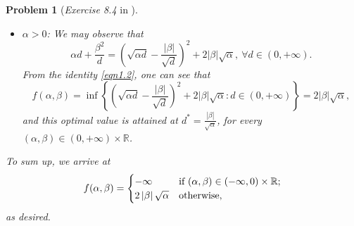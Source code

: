 \documentclass[11pt]{article}
\newtheorem{problem}{Problem}
\numberwithin{equation}{problem}
\begin{document}
\begin{problem} [\emph{Exercise 8.4} in \cite{calafiore2014optimization}]
{\begin{itemize}
    \item $\alpha > 0$: We may observe that
    \begin{equation}
        \label{eqn1.2}
        \alpha d + \frac{\beta^2}{d} = \left( \sqrt{\alpha d} - \frac{\left| \beta \right|}{\sqrt{d}} \right)^2 + 2 \left| \beta \right| \sqrt{\alpha},\ \forall d \in \left( 0, +\infty \right).
    \end{equation}
    From the identity \eqref{eqn1.2}, one can see that
    \begin{equation*}
        f(\alpha, \beta) = \inf \left\{ \left( \sqrt{\alpha d} - \frac{\left| \beta \right|}{\sqrt{d}} \right)^2 + 2 \left| \beta \right| \sqrt{\alpha} : d \in \left( 0, +\infty \right) \right\}
        = 2 \left| \beta \right| \sqrt{\alpha},
    \end{equation*}
    and this optimal value is attained at $d^* = \frac{\left| \beta \right|}{\sqrt{\alpha}}$, for every $(\alpha, \beta) \in \left( 0, +\infty \right) \times \mathbb{R}$.
\end{itemize}

\noindent To sum up, we arrive at
\begin{equation*}
    f(\alpha, \beta) =
    \begin{cases}
        - \infty & \textnormal{if } (\alpha, \beta) \in \left( -\infty, 0 \right) \times \mathbb{R}; \\
        2 \left| \beta \right| \sqrt{\alpha} & \textnormal{otherwise,}
    \end{cases}
\end{equation*}
as desired. 
\medskip

}
\end{problem}
\end{document}
